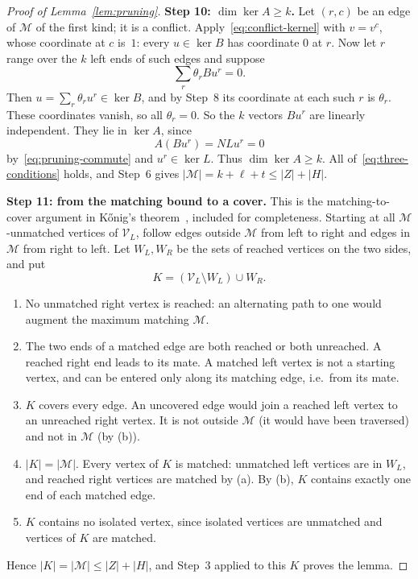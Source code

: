 \documentclass[11pt]{article}
\theoremstyle{remark}
\newcommand{\abs}[1]{\lvert #1\rvert}
\newcommand{\step}[1]{\par\medskip\noindent\textbf{#1}\enspace}
\begin{document}
\begin{proof}[Proof of Lemma~\ref{lem:pruning}]
\step{Step 10: $\dim\ker A\ge k$.}
Let $(r,c)$ be an edge of $\mathcal M$ of the first kind; it is a conflict.
Apply~\eqref{eq:conflict-kernel} with $v=v^c$, whose coordinate at $c$
is~$1$: every $u\in\ker B$ has coordinate $0$ at $r$.
Now let $r$ range over the $k$ left ends of such edges and suppose
\[
 \sum_r\theta_r Bu^r=0 .
\]
Then $u=\sum_r\theta_r u^r\in\ker B$, and by Step~8 its coordinate at each
such $r$ is $\theta_r$.  These coordinates vanish, so all $\theta_r=0$.
So the $k$ vectors $Bu^r$ are linearly independent.  They lie in $\ker A$,
since
\[
 A(Bu^r)=NLu^r=0
\]
by~\eqref{eq:pruning-commute} and $u^r\in\ker L$.  Thus $\dim\ker A\geq k$.
All of~\eqref{eq:three-conditions} holds, and Step~6 gives
$\abs{\mathcal M}=k+\ell+t\leq\abs Z+\abs H$.

\step{Step 11: from the matching bound to a cover.}
This is the matching-to-cover argument in K\H{o}nig's
theorem~\cite{konig1931}, included for completeness.  Starting at all
$\mathcal M$-unmatched vertices of $\mathcal V_L$, follow edges outside
$\mathcal M$ from left to right and edges in $\mathcal M$ from right to left.
Let $W_L,W_R$ be the sets of reached vertices on the two sides, and put
\[
 K=(\mathcal V_L\setminus W_L)\cup W_R .
\]
\begin{enumerate}[label=\textup{(\alph*)},nosep]
\item No unmatched right vertex is reached: an alternating path to one
 would augment the maximum matching $\mathcal M$.
\item The two ends of a matched edge are both reached or both unreached.
 A reached right end leads to its mate.  A matched left vertex is not a
 starting vertex, and can be entered only along its matching edge, i.e.\
 from its mate.
\item $K$ covers every edge.  An uncovered edge would join a reached left
 vertex to an unreached right vertex.  It is not outside $\mathcal M$ (it
 would have been traversed) and not in $\mathcal M$ (by (b)).
\item $\abs K=\abs{\mathcal M}$.  Every vertex of $K$ is matched:
 unmatched left vertices are in $W_L$, and reached right vertices are
 matched by (a).  By (b), $K$ contains exactly one end of each matched edge.
\item $K$ contains no isolated vertex, since isolated vertices are
 unmatched and vertices of $K$ are matched.
\end{enumerate}
Hence $\abs K=\abs{\mathcal M}\leq\abs Z+\abs H$, and Step~3 applied to this
$K$ proves the lemma.
\end{proof}
\end{document}
